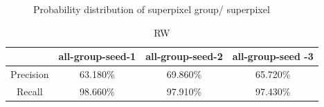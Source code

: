 \documentclass[runningheads,a4paper]{llncs}
\begin{document}
\begin{figure}
\centering

\caption{ Probability distribution of superpixel group/ superpixel  }
\label{fig: histogram}
\end{figure}





\begin{table}
\centering
\begin{tabular}{|c|c|c|c|}
\hline
& all-group-seed-1 & all-group-seed-2&all-group-seed -3 \\
\hline
Precision& 63.180\% & 69.860\% & 65.720\% \\
\hline
Recall& 98.660\% & 97.910\% & 97.430\%  \\
\hline
\end{tabular}
\caption{RW}
\end{table}
\end{document}
